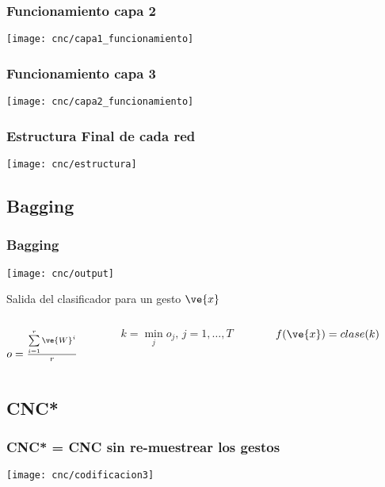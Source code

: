 \begin{myframe}
\frametitle{Funcionamiento capa 2}
\texttt{[image: cnc/capa1\_funcionamiento]}
\end{myframe}

\begin{myframe}
\frametitle{Funcionamiento capa 3}
\texttt{[image: cnc/capa2\_funcionamiento]}
\end{myframe}


\begin{myframe}
\frametitle{Estructura Final de cada red}
\texttt{[image: cnc/estructura]}
\end{myframe}

\subsection{Bagging}

\begin{myframe}
\frametitle{Bagging}
\centering
\small

\texttt{[image: cnc/output]}
\begin{block}{Salida del clasificador para un gesto $\ve{x}$}

\begin{columns}
\centering
\begin{column}{0.23\linewidth}
\centering
$o = \frac{\sum\limits_{i=1}^{r} \ve{W}^i}{r}$ 
\end{column}

\begin{column}{0.37\linewidth}
\centering
$k = \min\limits_j o_j, \, j=1,\dots,T$ 
\end{column}

\begin{column}{0.23\linewidth}
\centering
$f(\ve{x})= clase(k)$\\
\end{column}

\end{columns}

\end{block}

\end{myframe}

\subsection{CNC*}

\begin{myframe}
\frametitle{CNC* = CNC sin re-muestrear los gestos}
\texttt{[image: cnc/codificacion3]}
\end{myframe}
